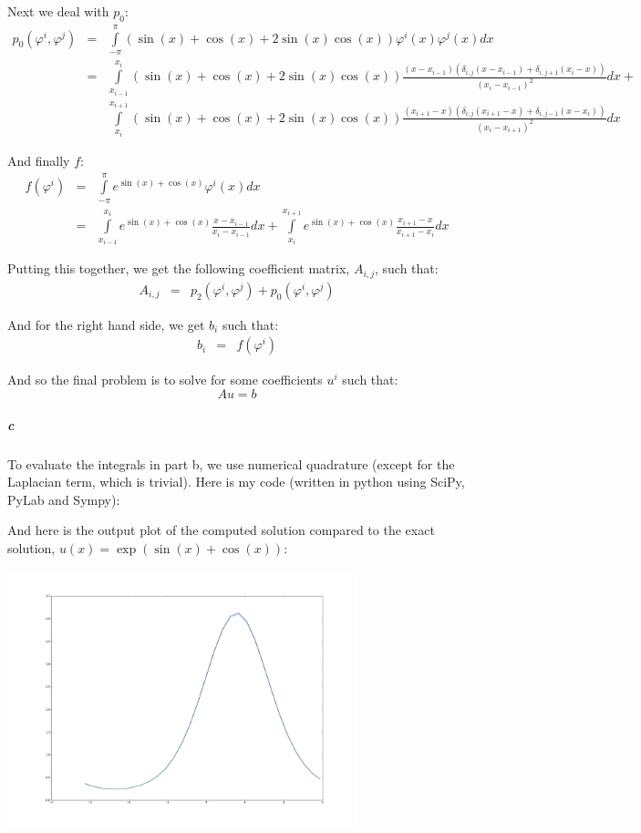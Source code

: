 \documentclass{article}
\begin{document}
Next we deal with $p_0$:
\begin{eqnarray*}
p_0(\varphi^i, \varphi^j) & = & \int \limits_{-\pi}^{\pi} \left( \sin(x) + \cos(x) + 2 \sin(x) \cos(x) \right) \varphi^i(x) \varphi^j(x) dx\\
 & = & 
\int \limits_{x_{i-1}}^{x_i} \left( \sin(x) + \cos(x) + 2 \sin(x) \cos(x) \right) \frac{ (x - x_{i-1}) (\delta_{i,j} (x - x_{i-1}) + \delta_{i,j+1}(x_i - x)) }{\left(x_{i} - x_{i-1}\right)^2} dx + \\
& & \int \limits_{x_{i}}^{x_{i+1}} \left( \sin(x) + \cos(x) + 2 \sin(x) \cos(x) \right) \frac{ (x_{i+1} - x) (\delta_{i,j} (x_{i+1} - x) + \delta_{i,j-1}(x - x_i))}{\left(x_{i} - x_{i+1}\right)^2} dx
\end{eqnarray*}

And finally $f$:
\begin{eqnarray*}
f(\varphi^i) & = & \int \limits_{-\pi}^{\pi} e^{\sin(x) + \cos(x)} \varphi^i(x) dx \\
& = & \int \limits_{x_{i-1}}^{x_i} e^{\sin(x) + \cos(x)} \frac{x - x_{i-1}}{x_{i} - x_{i-1}} dx + \int \limits_{x_{i}}^{x_{i+1}} e^{\sin(x) + \cos(x)} \frac{x_{i+1} - x}{x_{i+1} - x_{i}} dx
\end{eqnarray*}

Putting this together, we get the following coefficient matrix, $A_{i,j}$, such that:
\begin{eqnarray*}
A_{i,j} & = & p_2(\varphi^i, \varphi^j) + p_0(\varphi^i, \varphi^j)
\end{eqnarray*}

And for the right hand side, we get $b_i$ such that:
\begin{eqnarray*}
b_i & = & f(\varphi^i)
\end{eqnarray*}

And so the final problem is to solve for some coefficients $u^i$ such that:
\[ A u = b \]

\subparagraph{c}

To evaluate the integrals in part b, we use numerical quadrature (except for the Laplacian term, which is trivial).  Here is my code (written in python using SciPy, PyLab and Sympy):



And here is the output plot of the computed solution compared to the exact solution, $u(x) = \exp( \sin(x) + \cos(x) )$:

\begin{center}
\includegraphics[width=4in]{prob1_result.png}
\end{center}
\end{document}

